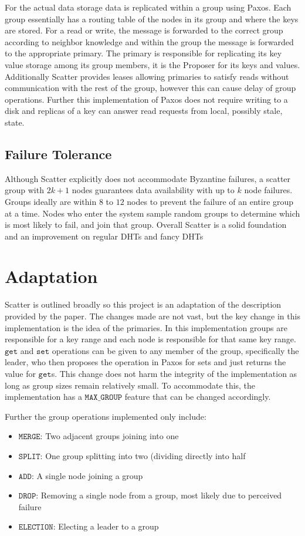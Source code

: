 \documentclass{amsart}
\theoremstyle{definition}
\theoremstyle{remark}
\numberwithin{equation}{section}
\begin{document}
For the actual data storage data is replicated within a group using Paxos. Each group essentially has a routing table of the nodes in its group and where the keys are stored. For a read or write, the message is forwarded to the correct group according to neighbor knowledge and within the group the message is forwarded to the appropriate primary. The primary is responsible for replicating its key value storage among its group members, it is the Proposer for its keys and values. Additionally Scatter provides leases allowing primaries to satisfy reads without communication with the rest of the group, however this can cause delay of group operations. Further this implementation of Paxos does not require writing to a disk and replicas of a key can answer read requests from local, possibly stale, state.
\subsection{Failure Tolerance}
Although Scatter explicitly does not accommodate Byzantine failures, a scatter group with $2k+1$ nodes guarantees data availability with up to $k$ node failures. Groups ideally are within $8$ to $12$ nodes to prevent the failure of an entire group at a time. Nodes who enter the system sample random groups to determine which is most likely to fail, and join that group. Overall Scatter is a solid foundation and an improvement on regular DHTs and fancy DHTs \cite{Scatter}  

\section{Adaptation}
Scatter is outlined broadly so this project is an adaptation of the description provided by the paper. The changes made are not vast, but the key change in this implementation is the idea of the primaries. In this implementation groups are responsible for a key range and each node is responsible for that same key range. $\mathtt{get}$ and $\mathtt{set}$ operations can be given to any member of the group, specifically the leader, who then proposes the operation in Paxos for sets and just returns the value for $\mathtt{get}$s. This change does not harm the integrity of the implementation as long as group sizes remain relatively small. To accommodate this, the implementation has a $\mathtt{MAX\_GROUP}$ feature that can be changed accordingly.

Further the group operations implemented only include: 
\begin{itemize}
\item $\mathtt{MERGE}$: Two adjacent groups joining into one
\item $\mathtt{SPLIT}$: One group splitting into two (dividing directly into half
\item $\mathtt{ADD}$: A single node joining a group
\item $\mathtt{DROP}$: Removing a single node from a group, most likely due to perceived failure
\item $\mathtt{ELECTION}$: Electing a leader to a group
\end{itemize}
\end{document}
